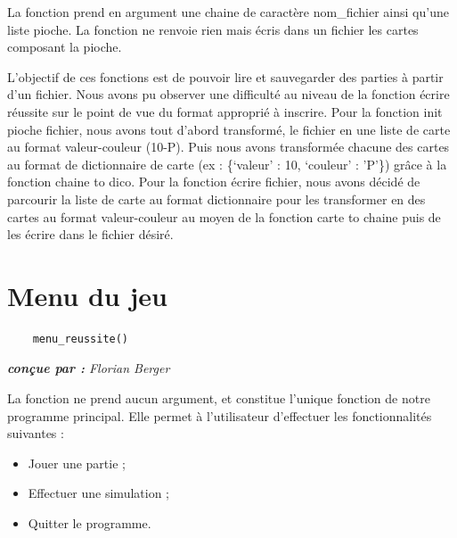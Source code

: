 \documentclass[titlepage]{article}
\begin{document}
 La fonction prend en argument une chaine de caractère nom\_fichier ainsi qu’une liste pioche. La fonction ne renvoie rien mais écris dans un fichier les cartes composant la pioche.
 
 \vspace{5mm}
 
L’objectif de ces fonctions est de pouvoir lire et sauvegarder des parties à partir d’un fichier. Nous avons pu observer une difficulté au niveau de la fonction écrire réussite sur le point de vue du format approprié à inscrire. 
Pour la fonction init pioche fichier, nous avons tout d’abord transformé, le fichier en une liste de carte au format valeur-couleur (10-P). Puis nous avons transformée chacune des cartes au format de dictionnaire de carte (ex : \{‘valeur’ : 10, ‘couleur’ : ’P’\}) grâce à la fonction chaine to dico. 
Pour la fonction écrire fichier, nous avons décidé de parcourir la liste de carte au format dictionnaire pour les transformer en des cartes au format valeur-couleur au moyen de la fonction carte to chaine puis de les écrire dans le fichier désiré.

\vspace{5mm}


\newpage \section{Menu du jeu}
\label{sec : menu}
\noindent	\begin{minipage}{\textwidth}
	\begin{lstlisting}
	menu_reussite()
	\end{lstlisting}	
	\end{minipage}

\emph{\textbf{conçue par : } Florian Berger} \vspace{2mm}\par
La fonction ne prend aucun argument, et constitue l'unique fonction de notre programme principal. Elle permet à l'utilisateur d'effectuer les fonctionnalités suivantes :
	\begin{itemize}
	\item Jouer une partie ;
	\item Effectuer une simulation ;
	\item Quitter le programme.
	\end{itemize}
	\par
\end{document}
